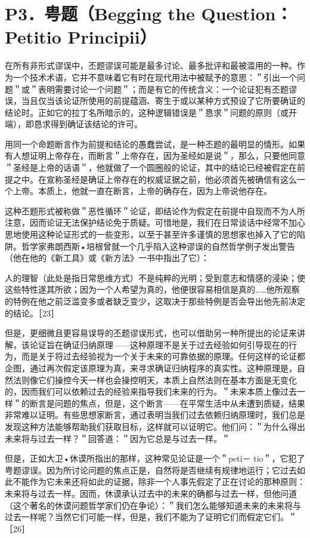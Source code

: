 \section*{P3．甹题（Begging the Question：Petitio Principii）}
在所有非形式谬误中，丕题谬误可能是最多讨论、最多批评和最被滥用的一种。作为一个技术术语，它并不意味着它有时在现代用法中被赋予的意思：＂引出一个问题＂或＂表明需要讨论一个问题＂；而是有它的传统含义：一个论证犯有丕题谬误，当且仅当该论证所使用的前提蕴涵、寄生于或以某种方式预设了它所要确证的结论时。正如它的拉丁名所暗示的，这种逻辑错误是＂恳求＂问题的原则（或开端），即恳求得到确证该结论的许可。

用同一个命题断言作为前提和结论的愚蠢尝试，是一种丕题的最明显的情形。如果有人想证明上帝存在，而断言＂上帝存在，因为圣经如是说＂，那么，只要他同意＂圣经是上帝的话语＂，他就做了一个圆圈般的论证，其中的结论已经被假定在前提之中。在宣称圣经是确证上帝存在的权威证据之前，他必须首先被确信有这么一个上帝。本质上，他就一直在断言，上帝的确存在，因为上帝说他存在。

这种丕题形式被称做＂恶性循环＂论证，即结论作为假定在前提中自现而不为人所注意，因而论证无法保护结论免于质疑。可惜地是，我们在日常谈话中经常不加心思地使用这种论证形式的一些变形，以至于甚至许多谨慎的思想家也掉入了它的陷阱。哲学家弗朗西斯•培根曾就一个几乎陷入这种谬误的自然哲学例子发出警告（他在他的《新工具》或《新方法》一书中指出了它）：

人的理智（此处是指日常思维方式）不是纯粹的光明；受到意志和情感的浸染；使这些特性遂其所欲；因为一个人希望为真的，他便很容易相信是真的……他所观察的特例在他之前泛滥变多或者缺乏变少，这取决于那些特例是否会导出他先前决定的结论。［23］

但是，更细微且更容易误导的丕题谬误形式，也可以借助另一种所提出的论证来讲解，该论证旨在确证归纳原理——这种原理不是关于过去经验如何引导现在的行为，而是关于将过去经验视为一个关于未来的可靠依据的原理。任何这样的论证都企图，通过再次假定该原理为真，来寻求确证归纳程序的真实性。这种原理是，自然法则像它们操控今天一样也会操控明天，本质上自然法则在基本方面是无变化的，因而我们可以依赖过去的经验来指导我们未来的行为。＂未来本质上像过去一样＂的断言是问题的焦点，但是，这个断言——在平常生活中从未遭到质疑，结果非常难以证明。有些思想家断言，通过表明当我们过去依赖归纳原理时，我们总是发现这种方法能够帮助我们获取目标，这样就可以证明它。他们问：＂为什么得出未来将与过去一样？＂回答道：＂因为它总是与过去一样。＂

但是，正如大卫•休谟所指出的那样，这种常见论证是一个＂peti－ tio＂，它犯了甹题谬误。因为所讨论问题的焦点正是，自然将是否继续有规律地运行；它过去如此不能作为它未来还将如此的证据，除非一个人事先假定了正在讨论的那种原则：未来将与过去一样。因而，休谟承认过去中的未来的确都与过去一样，但他问道（这个著名的休谟问题哲学家们仍在争论）：＂我们怎么能够知道未来的未来将与过去一样呢？当然它们可能一样，但是，我们不能为了证明它们而假定它们。＂［26］ 